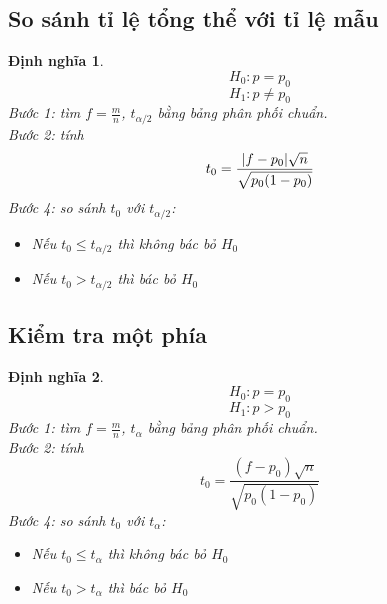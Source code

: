 \documentclass[12pt]{article}
\newtheorem{thm}{Định nghĩa}
\begin{document}
\subsection{So sánh tỉ lệ tổng thể với tỉ lệ mẫu}
\begin{thm}
    \begin{equation}
        H_0: p = p_0
    \end{equation}
    \begin{equation}
        H_1: p \neq p_0
    \end{equation}
    Bước 1: tìm $f = \frac{m}{n}$,  $t_{\alpha/2}$ bằng bảng phân phối chuẩn. \\
    Bước 2: tính \begin{equation}
        t_0 = \frac{\vert f - p_0 \vert\sqrt{n}}{\sqrt{p_0(1 - p_0)}}
    \end{equation}
    Bước 4: so sánh $t_0$ với $t_{\alpha/2}$:
    \begin{itemize}
        \item Nếu $t_0 \leq t_{\alpha/2}$ thì không bác bỏ $H_0$
        \item Nếu $ t_0 > t_{\alpha/2}$ thì bác bỏ $H_0$
    \end{itemize}
\end{thm}

\subsection{Kiểm tra một phía}
\begin{thm}
    \begin{equation}
        H_0: p = p_0
    \end{equation}
    \begin{equation}
        H_1: p > p_0
    \end{equation}
    Bước 1: tìm $f = \frac{m}{n}$,  $t_{\alpha}$ bằng bảng phân phối chuẩn. \\
    Bước 2: tính \begin{equation}
        t_0 = \frac{(f - p_0)\sqrt{n}}{\sqrt{p_0(1 - p_0)}}
    \end{equation}
    Bước 4: so sánh $t_0$ với $t_{\alpha}$:
    \begin{itemize}
        \item Nếu $t_0 \leq t_{\alpha}$ thì không bác bỏ $H_0$
        \item Nếu $ t_0 > t_{\alpha}$ thì bác bỏ $H_0$
    \end{itemize}
\end{thm}
\end{document}

